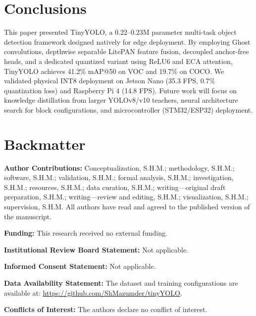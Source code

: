 \documentclass[article,submit,moreauthors,pdftex,10pt,a4paper]{article}
\begin{document}
\section{Conclusions}
This paper presented TinyYOLO, a 0.22--0.23M parameter multi-task object detection framework designed natively for edge deployment. By employing Ghost convolutions, depthwise separable LitePAN feature fusion, decoupled anchor-free heads, and a dedicated quantized variant using ReLU6 and ECA attention, TinyYOLO achieves 41.2\% mAP@50 on VOC and 19.7\% on COCO. We validated physical INT8 deployment on Jetson Nano (35.3 FPS, 0.7\% quantization loss) and Raspberry Pi 4 (14.8 FPS). Future work will focus on knowledge distillation from larger YOLOv8/v10 teachers, neural architecture search for block configurations, and microcontroller (STM32/ESP32) deployment.

\vspace{6pt}

\section*{Backmatter}

\noindent \textbf{Author Contributions:} Conceptualization, S.H.M.; methodology, S.H.M.; software, S.H.M.; validation, S.H.M.; formal analysis, S.H.M.; investigation, S.H.M.; resources, S.H.M.; data curation, S.H.M.; writing---original draft preparation, S.H.M.; writing---review and editing, S.H.M.; visualization, S.H.M.; supervision, S.H.M. All authors have read and agreed to the published version of the manuscript.

\noindent \textbf{Funding:} This research received no external funding.

\noindent \textbf{Institutional Review Board Statement:} Not applicable.

\noindent \textbf{Informed Consent Statement:} Not applicable.

\noindent \textbf{Data Availability Statement:} The dataset and training configurations are available at: \url{https://github.com/ShMazumder/tinyYOLO}.

\noindent \textbf{Conflicts of Interest:} The authors declare no conflict of interest.



\end{document}
